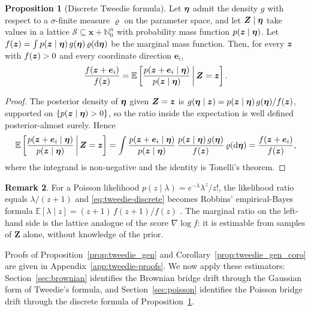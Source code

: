 \documentclass{article}
\def\E{\mathbb{E}}
\def\dd{\mathrm{d}}
\theoremstyle{definition}
\newtheorem{proposition}{Proposition}[section]
\newtheorem{remark}[proposition]{Remark}
\begin{document}
\begin{proposition}[Discrete Tweedie formula]\label{prop:tweedie_discrete}
    Let $\boldsymbol{\eta}$ admit the density $g$ with respect to a $\sigma$-finite measure $\varrho$ on the parameter space, and let $\boldsymbol{Z} \mid \boldsymbol{\eta}$ take values in a lattice $\mathcal{S} \subseteq \boldsymbol{x} + \mathbb{N}_0^n$ with probability mass function $p(\boldsymbol{z} \mid \boldsymbol{\eta})$. Let $f(\bfz) = \int p(\bfz \mid \bfeta)\, g(\bfeta)\, \varrho(\dd \bfeta)$ be the marginal mass function. Then, for every $\boldsymbol{z}$ with $f(\boldsymbol{z}) > 0$ and every coordinate direction $\boldsymbol{e}_i$,
    \begin{equation}\label{eq:tweedie-discrete}
        \frac{f(\bfz + \boldsymbol{e}_i)}{f(\bfz)} = \E\left[\frac{p(\bfz + \boldsymbol{e}_i \mid \bfeta)}{p(\bfz \mid \bfeta)} \,\middle|\, \boldsymbol{Z} = \bfz\right].
    \end{equation}
\end{proposition}
\begin{proof}
    The posterior density of $\boldsymbol{\eta}$ given $\boldsymbol{Z} = \boldsymbol{z}$ is $g(\boldsymbol{\eta} \mid \boldsymbol{z}) = p(\boldsymbol{z} \mid \boldsymbol{\eta})\, g(\boldsymbol{\eta}) / f(\boldsymbol{z})$, supported on $\{p(\boldsymbol{z} \mid \boldsymbol{\eta}) > 0\}$, so the ratio inside the expectation is well defined posterior-almost surely. Hence
    \begin{equation*}
        \E\left[\frac{p(\bfz + \boldsymbol{e}_i \mid \bfeta)}{p(\bfz \mid \bfeta)} \,\middle|\, \boldsymbol{Z} = \bfz\right]
        = \int \frac{p(\bfz + \boldsymbol{e}_i \mid \bfeta)}{p(\bfz \mid \bfeta)}\, \frac{p(\bfz \mid \bfeta)\, g(\bfeta)}{f(\bfz)}\, \varrho(\dd \bfeta)
        = \frac{f(\bfz + \boldsymbol{e}_i)}{f(\bfz)},
    \end{equation*}
    where the integrand is non-negative and the identity is Tonelli's theorem.
\end{proof}
\begin{remark}
    For a Poisson likelihood $p(z \mid \lambda) = e^{-\lambda}\lambda^{z}/z!$, the likelihood ratio equals $\lambda/(z+1)$ and \eqref{eq:tweedie-discrete} becomes Robbins' empirical-Bayes formula $\E[\lambda \mid z] = (z+1)\, f(z+1)/f(z)$ \cite{robbins1956}. The marginal ratio on the left-hand side is the lattice analogue of the score $\nabla \log f$: it is estimable from samples of $\boldsymbol{Z}$ alone, without knowledge of the prior.
\end{remark}

Proofs of Proposition~\ref{prop:tweedie_gen} and Corollary~\ref{prop:tweedie_gen_coro} are given in Appendix~\ref{app:tweedie-proofs}. We now apply these estimators: Section~\ref{sec:brownian} identifies the Brownian bridge drift through the Gaussian form of Tweedie's formula, and Section~\ref{sec:poisson} identifies the Poisson bridge drift through the discrete formula of Proposition~\ref{prop:tweedie_discrete}.
\end{document}
